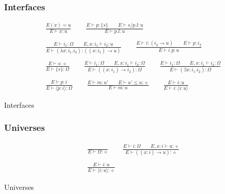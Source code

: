 \documentclass[twoside]{article}
\begin{document}
\subsubsection*{Interfaces \hfill
{}
}

\begin{displaymath}
\begin{array}{c}
\displaystyle
\frac{
E(x) = u
}{
E \vdash x : u
}
\qquad
\frac{
E \vdash p : \{s\}
\qquad
E \vdash s/p.l : u
}{
E \vdash p.l : u
}
\\\\\displaystyle
\frac{
E \vdash i_1 : \Omega
\qquad
E,x:i_1 \vdash i_2 : u
}{
E \vdash (\lambda x:i_1.i_2) : ((x:i_1)\to u)
}
\qquad
\frac{
E \vdash i : (i_2\to u)
\qquad
E \vdash p : i_2
}{
E \vdash i\;p : u
}
\\\\\displaystyle
\frac{
E \vdash s : \diamond
}{
E \vdash \{s\} : \Omega
}
\qquad
\frac{
E \vdash i_1 : \Omega
\qquad
E,x:i_1 \vdash i_2 : \Omega
}{
E \vdash ((x:i_1)\to i_2) : \Omega
}
\qquad
\frac{
E \vdash i_1 : \Omega
\qquad
E,x:i_1 \vdash i_2 : \Omega
}{
E \vdash (\exists x:i_1.i_2) : \Omega
}
\\\\\displaystyle
\frac{
E \vdash p : i
}{
E \vdash \langle p:i\rangle : \Omega
}
\qquad
\frac{
E \vdash m : u'
\qquad
E \vdash u' \leq u : \diamond
}{
E \vdash m : u
}
\qquad
\frac{
E \vdash i : u
}{
E \vdash i : \langle i:u\rangle
}
\end{array}
\end{displaymath}
\begin{center}Interfaces\end{center}



\subsubsection*{Universes \hfill
{}
}

\begin{displaymath}
\begin{array}{c}
\displaystyle
\frac{
}{
E \vdash \Omega : \diamond
}
\qquad
\frac{
E \vdash i : \Omega
\qquad
E,x:i \vdash u : \diamond
}{
E \vdash ((x:i)\to u) : \diamond
}
\\\\\displaystyle
\frac{
E \vdash i : u
}{
E \vdash \langle i:u \rangle : \diamond
}
\end{array}
\end{displaymath}
\begin{center}Universes\end{center}
\end{document}
